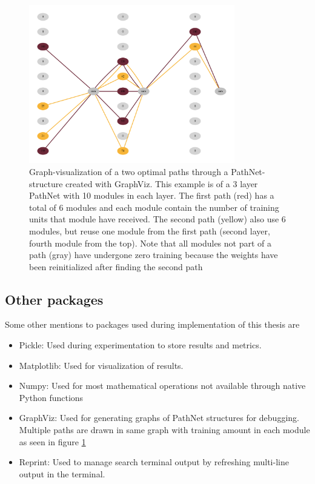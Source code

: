 \begin{figure}[h]
    \centering
    \includegraphics[width=0.8\textwidth]{Chapters/Implementation/figures/pathnet_visualization.pdf}
    \caption{Graph-visualization of a two optimal paths through a PathNet-structure created with GraphViz. This example is of a 3 layer PathNet with 10 modules in each layer. The first path (red) has a total of 6 modules and each module contain the number of training units that module have received. The second path (yellow) also use 6 modules, but reuse one module from the first path (second layer, fourth module from the top). Note that all modules not part of a path (gray) have undergone zero training because the weights have been reinitialized after finding the second path}
    \label{fig:pathnetexample}
\end{figure}

\subsection{Other packages}
Some other mentions to packages used during implementation of this thesis are
\begin{itemize}
    \item Pickle: Used during experimentation to store results and metrics.
    \item Matplotlib: Used for visualization of results.
    \item Numpy: Used for most mathematical operations not available through native Python functions 
    \item GraphViz: Used for generating graphs of PathNet structures for debugging. Multiple paths are drawn in same graph with training amount in each module as seen in figure \ref{fig:pathnetexample}
    \item Reprint: Used to manage search terminal output by refreshing multi-line output in the terminal.
\end{itemize}


